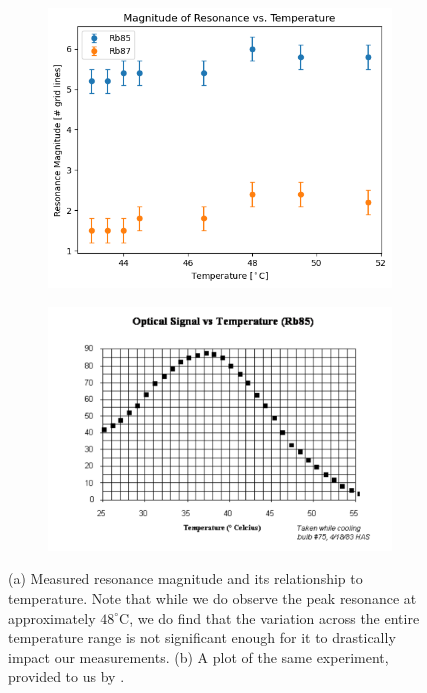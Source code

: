 \documentclass[10pt]{article}
\begin{document}
	\begin{figure}
		\begin{subfigure}{0.5\textwidth}
			\includegraphics[scale=0.5]{images/resonance-vs-temperature.png}
			\caption{}
			\label{resonance-vs-temperature}
		\end{subfigure}
		\begin{subfigure}{0.5\textwidth}
			\includegraphics[scale=0.5]{images/resonance-vs-temperature-manual.png}
			\caption{}
			\label{resonance-vs-temperature-manual}
		\end{subfigure}
		\caption{(a) Measured resonance magnitude and its relationship to
			temperature. Note that while we do observe the peak resonance at
			approximately \( 48^{\circ} \)C, we do find that the variation across the
			entire temperature range is not significant enough for it to drastically
		impact our measurements. (b) A plot of the same experiment, provided to us by
		\cite{lab-manual}.}
	\end{figure}
\end{document}

